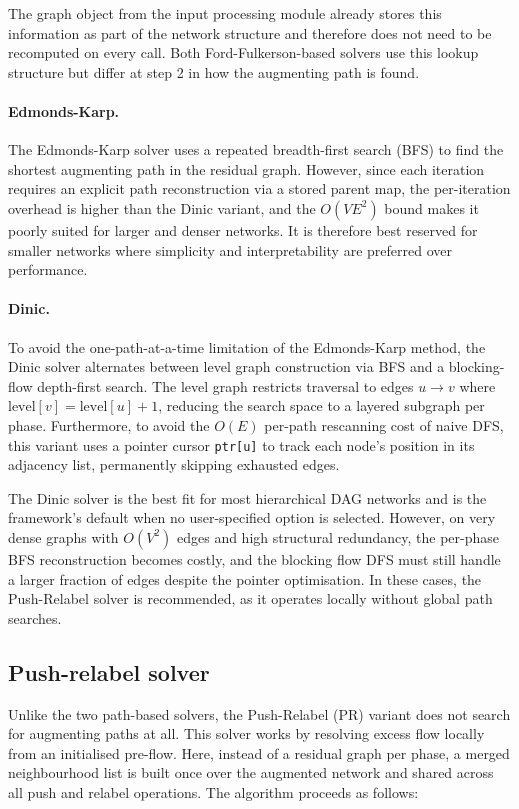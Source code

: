 \documentclass[12pt]{report}
\begin{document}
The graph object from the input processing module already stores this information as
part of the network structure and therefore does not need to be
recomputed on every call. Both Ford-Fulkerson-based solvers use this lookup structure 
but differ at step 2 in how the augmenting path is found.

\paragraph{Edmonds-Karp.} 
The Edmonds-Karp solver \cite{edmonds_theoretical_1972} uses a repeated breadth-first search (BFS) to find the shortest augmenting path in the residual graph. However, since each iteration requires an explicit path reconstruction via a stored parent map, the per-iteration overhead is higher than the Dinic variant, and the $O(VE^2)$ bound makes it poorly suited for larger and denser networks. It is therefore best reserved for smaller networks where simplicity and interpretability are preferred over performance.

\paragraph{Dinic.} 
To avoid the one-path-at-a-time limitation of the Edmonds-Karp method, the Dinic solver alternates between level graph construction via BFS and a blocking-flow depth-first search. The level graph restricts traversal to edges $u \to v$ where $\text{level}[v] = \text{level}[u] + 1$, reducing the search space to a layered subgraph per phase. Furthermore, to avoid the $O(E)$ per-path rescanning cost of naive DFS, this variant uses a pointer cursor \texttt{ptr[u]} to track each node's position in its adjacency list, permanently skipping exhausted edges. 

The Dinic solver is the best fit for most hierarchical DAG networks and is the framework's default when no user-specified option is selected. However, on very dense graphs with $O(V^2)$ edges and high structural redundancy, the per-phase BFS reconstruction becomes costly, and the blocking flow DFS must still handle a larger fraction of edges despite the pointer optimisation. In these cases, the Push-Relabel solver is recommended, as it operates locally without global path searches.

\subsection{Push-relabel solver}
Unlike the two path-based solvers, the Push-Relabel (PR) variant does not search for augmenting paths at all. This solver works by resolving excess flow locally from an initialised pre-flow.
Here, instead of a residual graph per phase, a merged neighbourhood list is built once over the augmented network and shared across all push and relabel operations. The algorithm proceeds as follows:
\end{document}
